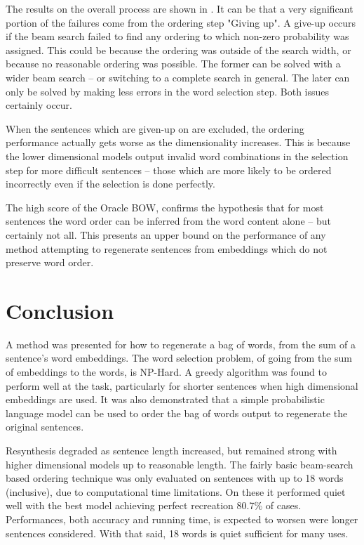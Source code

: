 \documentclass[11pt]{article}
\numberwithin{equation}{section}
\numberwithin{figure}{section}
\theoremstyle{plain}
\theoremstyle{definition}
\begin{document}
The results on the overall process are shown in  . It can be that a very significant portion of the failures come from the ordering step "Giving up". A give-up occurs if the beam search failed to find any ordering to which non-zero probability was assigned. This could be because the ordering was outside of the search width, or because no reasonable ordering was possible. The former can be solved with a wider beam search -- or switching to a complete search in general. The later can only be solved by making less errors in the word selection step. Both issues certainly occur. 

When the sentences which are given-up on are excluded, the ordering performance actually gets worse as the dimensionality increases. This is because the lower dimensional models output invalid word combinations in the selection step for more difficult sentences -- those which are more likely to be ordered incorrectly even if the selection is done perfectly.

The high score of the Oracle BOW, confirms the hypothesis that for most sentences the word order can be inferred from the word content alone -- but certainly not all. This presents an upper bound on the performance of any method attempting to regenerate sentences from embeddings which do not preserve word order. 


\section{Conclusion} \label{conclusion}
A method was presented for how to regenerate a bag of words, from the sum of a sentence's word embeddings. The word selection problem, of going from the sum of embeddings to the words, is NP-Hard. A greedy algorithm was found to perform well at the task, particularly for shorter sentences when high dimensional embeddings are used. It was also demonstrated that a simple probabilistic language model can be used to order the bag of words output to regenerate the original sentences.

Resynthesis degraded as sentence length increased, but remained strong with higher dimensional models up to reasonable length. The fairly basic beam-search based ordering technique was only evaluated on sentences with up to 18 words (inclusive), due to computational time limitations. On these it performed quiet well with the best model achieving perfect recreation 80.7\% of cases. Performances, both accuracy and running time, is expected to worsen were longer sentences considered. With that said, 18 words is quiet sufficient for many uses.
\end{document}
